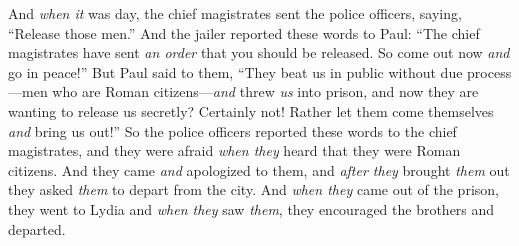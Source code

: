 \begin{biblechapter}
 And \textit{when it} was day, the chief magistrates sent the police officers, saying, “Release those men.”
\verse And the jailer reported these words to Paul: “The chief magistrates have sent \textit{an order} that you should be released. So come out now \textit{and} go in peace!”
\verse But Paul said to them, “They beat us in public without due process—men who are Roman citizens—\textit{and} threw \textit{us} into prison, and now they are wanting to release us secretly? Certainly not! Rather let them come themselves \textit{and} bring us out!”
\verse So the police officers reported these words to the chief magistrates, and they were afraid \textit{when they} heard that they were Roman citizens.
\verse And they came \textit{and} apologized to them, and \textit{after they} brought \textit{them} out they asked \textit{them} to depart from the city.
\verse And \textit{when they} came out of the prison, they went to Lydia and \textit{when they} saw \textit{them}, they encouraged the brothers and departed.
\end{biblechapter}

